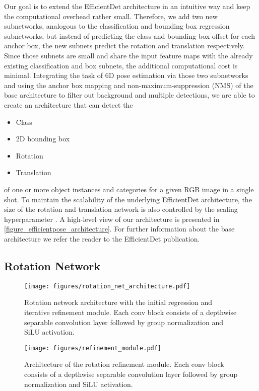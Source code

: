 \documentclass[twocolumn, 10pt, letterpaper]{article}
\begin{document}
Our goal is to extend the EfficientDet architecture in an intuitive way and keep the computational overhead rather small. Therefore, we add two new subnetworks, analogous to the classification and bounding box regression subnetworks, but instead of predicting the class and bounding box offset for each anchor box, the new subnets predict the rotation  and translation  respectively. Since those subnets are small and share the input feature maps with the already existing classification and box subnets, the additional computational cost is minimal. Integrating the task of 6D pose estimation via those two subnetworks and using the anchor box mapping and non-maximum-suppression (NMS) of the base architecture to filter out background and multiple detections, we are able to create an architecture that can detect the 
\begin{itemize}
	\item Class
	\item 2D bounding box
	\item Rotation
	\item Translation
\end{itemize}
of one or more object instances and categories for a given RGB image in a single shot. To maintain the scalability of the underlying EfficientDet architecture, the size of the rotation and translation network is also controlled by the scaling hyperparameter . A high-level view of our architecture is presented in \autoref{figure_efficientpose_architecture}. For further information about the base architecture we refer the reader to the EfficientDet publication\cite{EfficientDet}.

\subsection{Rotation Network}
\label{subsection_rotation_network}

\begin{figure*}
\centering
\texttt{[image: figures/rotation\_net\_architecture.pdf]}
\caption{Rotation network architecture with the initial regression and iterative refinement module. Each conv block consists of a depthwise separable convolution layer followed by group normalization and SiLU activation.}
\label{figure_rotation_architecture}
\end{figure*}

\begin{figure}
\centering
\texttt{[image: figures/refinement\_module.pdf]}
\caption{Architecture of the rotation refinement module. Each conv block consists of a depthwise separable convolution layer followed by group normalization and SiLU activation.}
\label{figure_refinement_architecture}
\end{figure}
\end{document}
